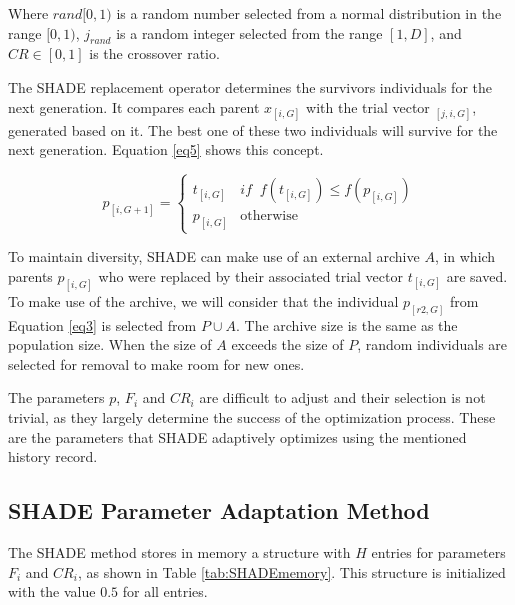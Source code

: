 \documentclass[review]{elsarticle}
\begin{document}
Where $rand[0,1)$ is a random number selected from a normal distribution in the range $[0,1)$, $j_{rand}$ is a random integer selected from the range $[1,D]$, and $CR \in [0,1]$ is the crossover ratio.

The SHADE replacement operator determines the survivors individuals for the next generation. It compares each parent $x_{[i,G]}$ with the trial vector $_{[j,i,G]}$, generated based on it. The best one of these two individuals will survive for the next generation. Equation \eqref{eq5} shows this concept.

\begin{equation}
p_{[i,G + 1]} = \left\{ \begin{array}{lc}
t_{[i,G]} &   if \;\; f(t_{[i,G]}) \le f(p_{[i,G]}) \\
p_{[i,G]} &  \text{otherwise}
\end{array}
\right.
\label{eq5}
\end{equation}

To maintain diversity, SHADE can make use of an external archive $A$, in which parents $p_{[i,G]}$ who were replaced by their associated trial vector $t_{[i,G]}$ are saved. To make use of the archive, we will consider that the individual $p_{[r2,G]}$ from Equation \eqref{eq3} is selected from $P \cup A$. The archive size is the same as the population size. When the size of $A$ exceeds the size of $P$, random individuals are selected for removal to make room for new ones.

The parameters $p$, $F_i$ and $CR_i$ are difficult to adjust and their selection is not trivial, as they largely determine the success of the optimization process. These are the parameters that SHADE adaptively optimizes using the mentioned history record.

\subsection{SHADE Parameter Adaptation Method}

The SHADE method stores in memory a structure with $H$ entries for parameters $F_i$ and $CR_i$, as shown in Table \ref{tab:SHADEmemory}. This structure is initialized with the value $0.5$ for all entries.

\begin{table}[!h]
	\centering
	\setlength{\tabcolsep}{13pt}
	\caption{Historical memory $M_{CR}$, $M_{F}$ used by SHADE \cite{tanabe2013success}}
	\label{tab:SHADEmemory}
\end{table}
\end{document}
